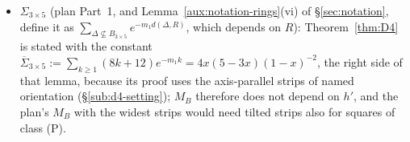\begin{itemize}
Lemma~\ref{lem:D2}(b); the theorems use form (a), with explicitly assigned strips (so that each
application has a named orientation) and the sum over the squares on which $h$ is not almost
everywhere zero (Remark~\ref{aux:d2-uses}).
\item \emph{$\Sigma_{3\times5}$} (plan Part~1, and Lemma~\ref{aux:notation-rings}(vi) of
\S\ref{sec:notation}, define it as $\sum_{\Delta\not\subseteq B_{3\times5}}e^{-m_1d(\Delta,R)}$,
which depends on $R$): Theorem~\ref{thm:D4} is stated with the constant
$\overline\Sigma_{3\times5}:=\sum_{k\ge1}(8k+12)e^{-m_1k}=4x(5-3x)(1-x)^{-2}$, the right side of
that lemma, because its proof uses the axis-parallel strips of named orientation
(\S\ref{sub:d4-setting}); $M_B$ therefore does not depend on $h'$, and the plan's $M_B$ with the
widest strips would need tilted strips also for squares of class (P).
\end{itemize}
